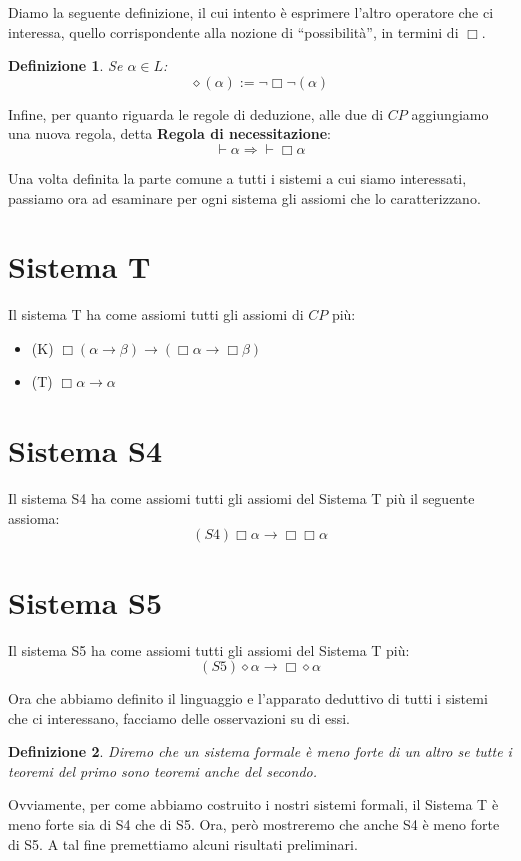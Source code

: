 \documentclass[a4paper, 12pt]{article}
\newtheorem{definition}{Definizione}
\begin{document}
Diamo la seguente definizione, il cui intento è esprimere l'altro operatore
che ci interessa, quello corrispondente alla nozione di ``possibilità'', in termini di $\Box$.

\begin{definition}
Se $\alpha \in L$:
$$\diamond (\alpha) := \neg \Box \neg (\alpha)$$
\end{definition}

Infine, per quanto riguarda le regole di deduzione, alle due di $CP$ aggiungiamo
una nuova regola, detta \textbf{Regola di necessitazione}:
$$\vdash \alpha \Rightarrow \vdash \Box \alpha$$

Una volta definita la parte comune a tutti i sistemi a cui siamo interessati,
passiamo ora ad esaminare per ogni sistema gli assiomi che lo caratterizzano.

\section{Sistema T}
Il sistema T ha come assiomi tutti gli assiomi di $CP$ più:
\begin{itemize}
\item (K) $\Box (\alpha \rightarrow \beta) \rightarrow (\Box \alpha \rightarrow \Box \beta)$
\item (T) $\Box \alpha \rightarrow \alpha$
\end{itemize}

\section{Sistema S4}
Il sistema S4 ha come assiomi tutti gli assiomi del Sistema T più il seguente assioma:
$$(S4) \Box \alpha \rightarrow \Box \Box \alpha$$

\section{Sistema S5}
Il sistema S5 ha come assiomi tutti gli assiomi del Sistema T più:
$$(S5) \diamond \alpha \rightarrow \Box \diamond \alpha$$


Ora che abbiamo definito il linguaggio e l'apparato deduttivo di tutti i sistemi
che ci interessano, facciamo delle osservazioni su di essi.
\begin{definition}
Diremo che un sistema formale è meno forte di un altro se tutte i teoremi del primo
sono teoremi anche del secondo.
\end{definition}

Ovviamente, per come abbiamo costruito i nostri sistemi formali, il Sistema T è meno forte
sia di S4 che di S5.
Ora, però mostreremo che anche S4 è meno forte di S5. A tal fine premettiamo alcuni risultati
preliminari.
\end{document}
